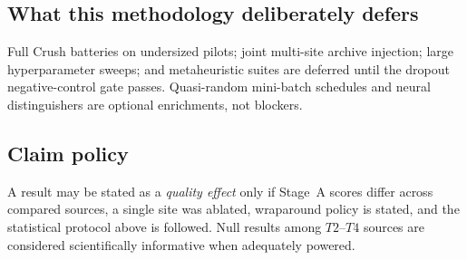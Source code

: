 \subsection{What this methodology deliberately defers}

Full Crush batteries on undersized pilots; joint multi-site archive injection; large hyperparameter sweeps; and metaheuristic suites are deferred until the dropout negative-control gate passes.
Quasi-random mini-batch schedules and neural distinguishers are optional enrichments, not blockers.

\subsection{Claim policy}

A result may be stated as a \emph{quality effect} only if Stage~A scores differ across compared sources, a single site was ablated, wraparound policy is stated, and the statistical protocol above is followed.
Null results among $T2$--$T4$ sources are considered scientifically informative when adequately powered.
